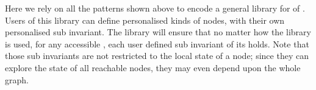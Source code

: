 


Here we rely on all the patterns shown above to encode a general library for \Q@Graph@s
of \Q@Node@s.
Users of this library can define personalised kinds of nodes,
with their own personalised sub invariant.
The library will ensure that no matter how the library is used, for any accessible \Q@Graph@, each user defined sub invariant of its \Q@Node@s holds.
Note that those sub invariants are not restricted to the local state of a node; since they can explore the state of all reachable nodes, they may even depend upon the whole graph.

